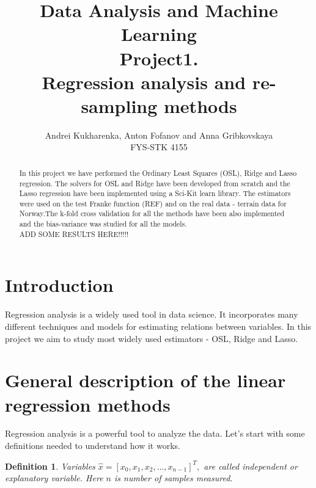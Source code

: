 \documentclass[10pt]{article}
\newtheorem{defn}{Definition}
\begin{document}
\setlength\parindent{1pt}
\title{Data Analysis and Machine Learning \\
Project1.\\ Regression analysis and re-sampling methods}
\author{Andrei Kukharenka, Anton Fofanov and Anna Gribkovskaya \\  
FYS-STK 4155 
}

\maketitle
\begin{abstract}
In this project we have performed the Ordinary Least Squares (OSL), Ridge and Lasso regression. The solvers for OSL and Ridge have been developed from scratch and the Lasso regression have been implemented using a Sci-Kit learn library. The estimators were used on the test Franke function (REF) and on the real data - terrain data for Norway.The k-fold cross validation for all the methods have been also implemented and the bias-variance was studied for all the models.\\
ADD SOME RESULTS HERE!!!!!
\end{abstract}
\clearpage 


\section{Introduction}
Regression analysis is a widely used tool in data science. It incorporates many different techniques and models for estimating relations between variables. In this project we aim to study most widely used estimators - OSL, Ridge and Lasso. 


\section{General description of the linear regression methods}
Regression analysis is a powerful tool to analyze the data. Let's start with some definitions needed to understand how it works.
\begin{defn}
Variables $\hat{x} = [x_0,x_1, x_2,\dots, x_{n-1}]^T,$ are called independent  or explanatory variable. Here $n$ is number of samples measured.
\end{defn}
\end{document}
